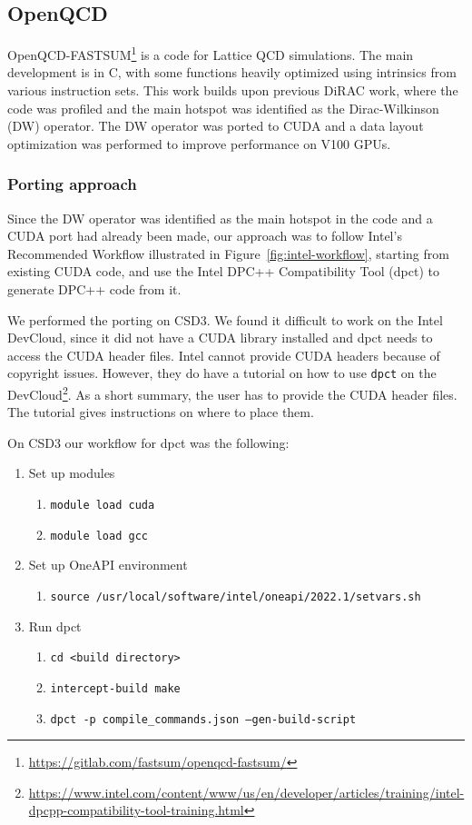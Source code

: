 \documentclass[../main]{subfiles}
\begin{document}
\subsection{OpenQCD}\label{sec:openqcd}

OpenQCD-FASTSUM\footnote{\url{https://gitlab.com/fastsum/openqcd-fastsum/}} is a code for Lattice QCD simulations.
The main development is in C, with some functions heavily optimized using intrinsics from various instruction sets.
This work builds upon previous DiRAC work, where the code was profiled and the main hotspot was identified as the Dirac-Wilkinson (DW) operator.
The DW operator was ported to CUDA and a data layout optimization was performed to improve performance on V100 GPUs.

\subsubsection{Porting approach}\label{sec:openqcd_porting}

Since the DW operator was identified as the main hotspot in the code and a CUDA port had already been made, our approach was to follow Intel's Recommended Workflow illustrated in Figure~\ref{fig:intel-workflow}, starting from existing CUDA code, and use the Intel DPC++ Compatibility Tool (dpct) to generate DPC++ code from it.

We performed the porting on CSD3.
We found it difficult to work on the Intel DevCloud, since it did not have a CUDA library installed and dpct needs to access the CUDA header files.
Intel cannot provide CUDA headers because of copyright issues.
However, they do have a tutorial on how to use \texttt{dpct} on the DevCloud\footnote{\url{https://www.intel.com/content/www/us/en/developer/articles/training/intel-dpcpp-compatibility-tool-training.html}}.
As a short summary, the user has to provide the CUDA header files.
The tutorial gives instructions on where to place them.

On CSD3 our workflow for dpct was the following:

\begin{enumerate}
	\item Set up modules
	      \begin{enumerate}
		      \item\texttt{module load cuda}
		      \item\texttt{module load gcc}
	      \end{enumerate}
	\item Set up OneAPI environment
	      \begin{enumerate}
		      \item\texttt{source /usr/local/software/intel/oneapi/2022.1/setvars.sh}
	      \end{enumerate}
	\item Run dpct
	      \begin{enumerate}
		      \item\texttt{cd <build directory>}
		      \item\texttt{intercept-build make}
		      \item\texttt{dpct -p compile\_commands.json --gen-build-script}
	      \end{enumerate}
\end{enumerate}
\end{document}
